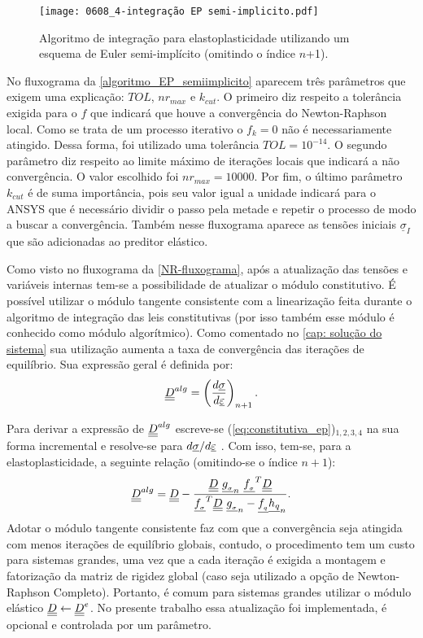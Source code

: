 \begin{figure}[H]
	\begin{center}
		\texttt{[image: 0608\_4-integração EP semi-implicito.pdf]}
	\end{center}
	\caption{\label{algoritmo_EP_semiimplicito}Algoritmo de integração para elastoplasticidade utilizando um esquema de Euler semi-implícito (omitindo o índice $n$+1).}
\end{figure}
No fluxograma da \autoref{algoritmo_EP_semiimplicito} aparecem três parâmetros que exigem uma explicação: $TOL$, $nr_{max}$ e $k_{cut}$. O primeiro diz respeito a tolerância exigida para o $f$ que indicará que houve a convergência do Newton-Raphson local. Como se trata de um processo iterativo o $f_k=0$ não é necessariamente atingido. Dessa forma, foi utilizado uma tolerância $TOL = 10^{-14}$. O segundo parâmetro diz respeito ao limite máximo de iterações locais que indicará a não convergência. O valor escolhido foi $nr_{max} = 10000$. Por fim, o último parâmetro $k_{cut}$ é de suma importância, pois seu valor igual a unidade indicará para o ANSYS que é necessário dividir o passo pela metade e repetir o processo de modo a buscar a convergência. Também nesse fluxograma aparece as tensões iniciais $\underline \sigma_{I}$ que são adicionadas ao preditor elástico.

Como visto no fluxograma da \autoref{NR-fluxograma}, após a atualização das tensões e variáveis internas tem-se a possibilidade de atualizar o módulo constitutivo. É possível utilizar o módulo tangente consistente com a linearização feita durante o algoritmo de integração das leis constitutivas (por isso também esse módulo é conhecido como módulo algorítmico). Como comentado no \autoref{cap: solução do sistema} sua utilização aumenta a taxa de convergência das iterações de equilíbrio. Sua expressão geral é definida por:
\begin{equation}
	\label{eq:D_alg1}
	\underline{\underline D}^{alg} = \left(\dfrac{d\underline \sigma}{d\underline{\varepsilon}} \right)_{n+1}.
\end{equation}

Para derivar a expressão de $\underline{\underline D}^{alg}$  escreve-se (\ref{eq:constitutiva_ep})$_{1,2,3,4}$ na sua forma incremental e resolve-se para $d\underline \sigma/d\underline{\varepsilon}$  \cite[p. 285]{Belytschko2000}. Com isso, tem-se, para a elastoplasticidade, a seguinte relação (omitindo-se o índice $n+1$):
\begin{equation}
	\label{eq:D_alg_ep}
	\underline{\underline D}^{alg} = \underline{\underline D} - \dfrac{\underline{\underline D}~\underline{g_{_\sigma}}_n~\underline{f_{_\sigma}}^T \underline{\underline D}}{\underline{f_{_\sigma}}^T\underline{\underline D}~\underline{g_{_\sigma}}_n-\underline{f_{_q}} \underline{h_q}_n}.
\end{equation}
Adotar o módulo tangente consistente faz com que a convergência seja atingida com menos iterações de equilíbrio globais, contudo, o procedimento tem um custo para sistemas grandes, uma vez que a cada iteração é exigida a montagem e fatorização da matriz de rigidez global (caso seja utilizado a opção de Newton-Raphson Completo).  Portanto, é comum para sistemas grandes utilizar o módulo elástico $\underline{\underline D} \leftarrow \underline{\underline D}^e$. No presente trabalho essa atualização foi implementada, é opcional e controlada por um parâmetro.

